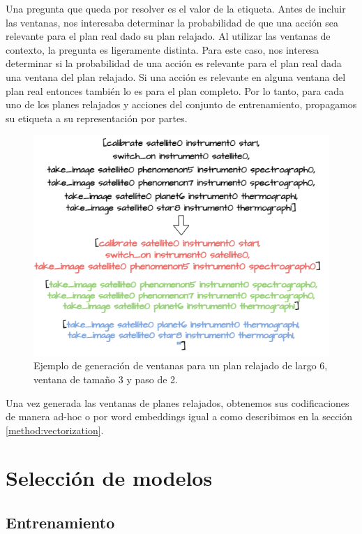 Una pregunta que queda por resolver es el valor de la etiqueta. Antes de incluir
las ventanas, nos interesaba determinar la probabilidad de que una acción sea
relevante para el plan real dado su plan relajado. Al utilizar las ventanas de
contexto, la pregunta es ligeramente distinta. Para este caso, nos interesa
determinar si la probabilidad de una acción es relevante para el plan real dada
una ventana del plan relajado. Si una acción es relevante en alguna ventana del
plan real entonces también lo es para el plan completo. Por lo tanto, para cada
uno de los planes relajados y acciones del conjunto de entrenamiento, propagamos
su etiqueta a su representación por partes.

\begin{figure}[t!]
    \centering
    \includegraphics[width=\linewidth]{figures/window_example.png}
    \caption{Ejemplo de generación de ventanas para un plan relajado de largo 6, ventana de tamaño 3 y paso de 2.}
    \label{fig:window_example}
\end{figure}

Una vez generada las ventanas de planes relajados, obtenemos sus codificaciones
de manera ad-hoc o por word embeddings igual a como describimos en la sección
\ref{method:vectorization}.

\section{Selección de modelos}
\label{method:model_selection}

\subsection{Entrenamiento}

